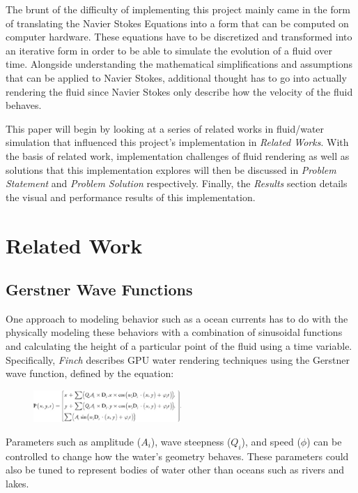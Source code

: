 \documentclass[conference]{IEEEtran}
\begin{document}
The brunt of the difficulty of implementing this project mainly came in the form of translating the Navier Stokes Equations into a form that can be computed on computer hardware. These equations have to be discretized and transformed into an iterative form in order to be able to simulate the evolution of a fluid over time. Alongside understanding the mathematical simplifications and assumptions that can be applied to Navier Stokes, additional thought has to go into actually rendering the fluid since Navier Stokes only describe how the velocity of the fluid behaves.

This paper will begin by looking at a series of related works in fluid/water simulation that influenced this project's implementation in \textit{Related Works}. With the basis of related work, implementation challenges of fluid rendering as well as solutions that this implementation explores will then be discussed in \textit{Problem Statement} and \textit{Problem Solution} respectively. Finally, the \textit{Results} section details the visual and performance results of this implementation.

\section{Related Work}

\subsection{Gerstner Wave Functions}

One approach to modeling behavior such as a ocean currents has to do with the physically modeling these behaviors with a combination of sinusoidal functions and calculating the height of a particular point of the fluid using a time variable. Specifically, \textit{Finch}\cite{gerstner} describes GPU water rendering techniques using the Gerstner wave function, defined by the equation:

\begin{figure}[htbp]
\centerline{\includegraphics[width=0.5\textwidth]{gerstner.jpg}}
\end{figure}

Parameters such as amplitude ($A_i$), wave steepness ($Q_i$), and speed ($\phi$) can be controlled to change how the water's geometry behaves. These parameters could also be tuned to represent bodies of water other than oceans such as rivers and lakes. 
\end{document}
